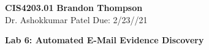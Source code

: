 \noindent
\textbf{CIS4203.01} \hfill \textbf{Brandon Thompson} \\
\normalsize Dr. Ashokkumar Patel \hfill Due: 2/23//21\\

\begin{center}
\textbf{Lab 6: Automated E-Mail Evidence Discovery}
\end{center}
